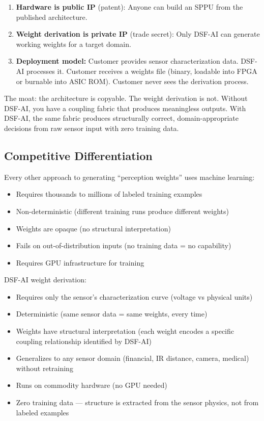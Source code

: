 \documentclass[11pt,a4paper]{article}
\begin{document}
\begin{enumerate}
    \item \textbf{Hardware is public IP} (patent): Anyone can build an SPPU from the published architecture.
    \item \textbf{Weight derivation is private IP} (trade secret): Only DSF-AI can generate working weights for a target domain.
    \item \textbf{Deployment model:} Customer provides sensor characterization data. DSF-AI processes it. Customer receives a weights file (binary, loadable into FPGA or burnable into ASIC ROM). Customer never sees the derivation process.
\end{enumerate}

The moat: the architecture is copyable. The weight derivation is not. Without DSF-AI, you have a coupling fabric that produces meaningless outputs. With DSF-AI, the same fabric produces structurally correct, domain-appropriate decisions from raw sensor input with zero training data.

\subsection{Competitive Differentiation}

Every other approach to generating ``perception weights'' uses machine learning:
\begin{itemize}
    \item Requires thousands to millions of labeled training examples
    \item Non-deterministic (different training runs produce different weights)
    \item Weights are opaque (no structural interpretation)
    \item Fails on out-of-distribution inputs (no training data = no capability)
    \item Requires GPU infrastructure for training
\end{itemize}

DSF-AI weight derivation:
\begin{itemize}
    \item Requires only the sensor's characterization curve (voltage vs physical units)
    \item Deterministic (same sensor data = same weights, every time)
    \item Weights have structural interpretation (each weight encodes a specific coupling relationship identified by DSF-AI)
    \item Generalizes to any sensor domain (financial, IR distance, camera, medical) without retraining
    \item Runs on commodity hardware (no GPU needed)
    \item Zero training data --- structure is extracted from the sensor physics, not from labeled examples
\end{itemize}
\end{document}
